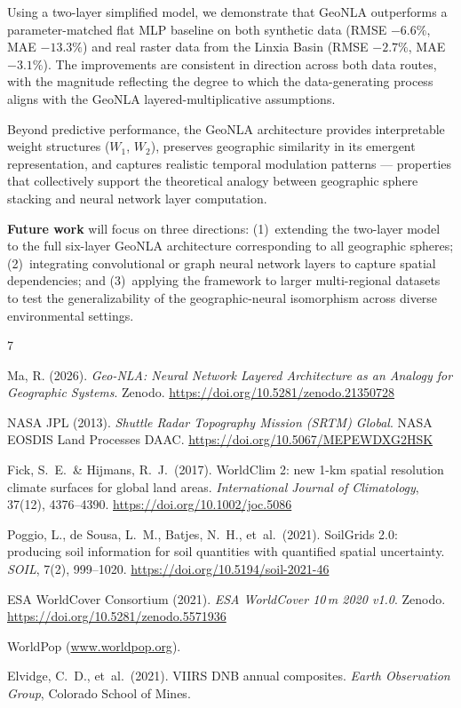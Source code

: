 \documentclass[a4paper,11pt]{article}
\begin{document}
Using a two-layer simplified model, we demonstrate that GeoNLA outperforms a parameter-matched flat MLP baseline on both synthetic data (RMSE $-6.6\%$, MAE $-13.3\%$) and real raster data from the Linxia Basin (RMSE $-2.7\%$, MAE $-3.1\%$). The improvements are consistent in direction across both data routes, with the magnitude reflecting the degree to which the data-generating process aligns with the GeoNLA layered-multiplicative assumptions.

Beyond predictive performance, the GeoNLA architecture provides interpretable weight structures ($W_1$, $W_2$), preserves geographic similarity in its emergent representation, and captures realistic temporal modulation patterns --- properties that collectively support the theoretical analogy between geographic sphere stacking and neural network layer computation.

\textbf{Future work} will focus on three directions: (1)~extending the two-layer model to the full six-layer GeoNLA architecture corresponding to all geographic spheres; (2)~integrating convolutional or graph neural network layers to capture spatial dependencies; and (3)~applying the framework to larger multi-regional datasets to test the generalizability of the geographic-neural isomorphism across diverse environmental settings.

\begin{thebibliography}{7}

Ma, R. (2026).
\emph{Geo-NLA: Neural Network Layered Architecture as an Analogy for Geographic Systems}.
Zenodo.
\url{https://doi.org/10.5281/zenodo.21350728}

NASA JPL (2013).
\emph{Shuttle Radar Topography Mission (SRTM) Global}.
NASA EOSDIS Land Processes DAAC.
\url{https://doi.org/10.5067/MEPEWDXG2HSK}

Fick, S.\ E.\ \& Hijmans, R.\ J.\ (2017).
WorldClim 2: new 1-km spatial resolution climate surfaces for global land areas.
\emph{International Journal of Climatology}, 37(12), 4376--4390.
\url{https://doi.org/10.1002/joc.5086}

Poggio, L., de Sousa, L.\ M., Batjes, N.\ H., et~al.\ (2021).
SoilGrids 2.0: producing soil information for soil quantities with quantified spatial uncertainty.
\emph{SOIL}, 7(2), 999--1020.
\url{https://doi.org/10.5194/soil-2021-46}

ESA WorldCover Consortium (2021).
\emph{ESA WorldCover 10\,m 2020 v1.0}.
Zenodo.
\url{https://doi.org/10.5281/zenodo.5571936}

WorldPop (\url{www.worldpop.org}).

Elvidge, C.\ D., et~al.\ (2021).
VIIRS DNB annual composites.
\emph{Earth Observation Group}, Colorado School of Mines.

\end{thebibliography}
\end{document}
